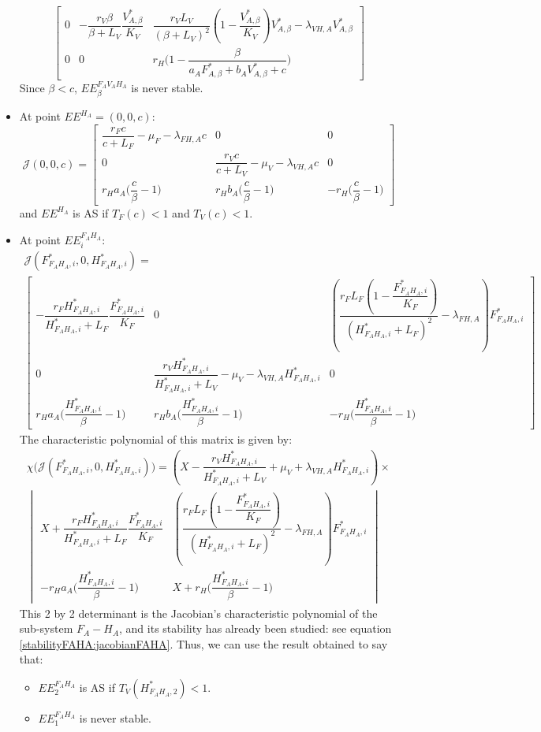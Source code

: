 \documentclass{article}
\newcommand{\lfa}{\lambda_{FH, A}}
\newcommand{\lva}{\lambda_{VH, A}}
\begin{document}
\begin{itemize}
\[\begin{bmatrix}
0 & -\dfrac{r_V \beta}{\beta + L_V}\dfrac{V^*_{A, \beta}}{K_V} & \dfrac{r_V L_V}{(\beta+L_V)^2}\left(1-\dfrac{V^*_{A, \beta}}{K_V}\right)V^*_{A, \beta}  - \lva V^*_{A, \beta} \\
0 & 0 & r_H \Big(1-\dfrac{\beta}{a_AF^*_{A, \beta} + b_AV^*_{A, \beta} + c}\Big)
\end{bmatrix}
\]
Since $\beta < c$, $EE^{F_AV_AH_A}_\beta$ is never stable.
\item At point $EE^{H_A} = (0, 0, c)$:
\[
\mathcal{J}(0,0,c) = \begin{bmatrix}
\dfrac{r_F c}{c + L_F} - \mu_F - \lfa c & 0 & 0\\
0 &\dfrac{r_V c}{c + L_V} - \mu_V - \lva c & 0\\
r_H a_A \Big(\dfrac{c}{\beta}-1\Big) & r_H b_A \Big(\dfrac{c}{\beta}-1\Big) & -r_H \Big(\dfrac{c}{\beta}-1\Big)
\end{bmatrix}
\]
and $EE^{H_A}$ is AS if $T_F(c) < 1$ and $T_V(c) < 1$.
\item At point $EE^{F_AH_A}_i$:
\begin{multline*}
\mathcal{J}(F^*_{F_AH_A, i},0,H^*_{F_AH_A, i}) = \\ \begin{bmatrix}
-\dfrac{r_F H^*_{F_AH_A, i}}{H^*_{F_AH_A, i} + L_F}\dfrac{F^*_{F_AH_A, i}}{K_F} & 0 & \left(\dfrac{r_F L_F \left(1-\dfrac{F^*_{F_AH_A, i}}{K_F}\right)}{(H^*_{F_AH_A, i}+L_F)^2}  - \lfa\right) F^*_{F_AH_A, i} \\
0 &\dfrac{r_V H^*_{F_AH_A, i}}{H^*_{F_AH_A, i} + L_V} - \mu_V - \lva H^*_{F_AH_A, i} & 0\\ 
 r_H a_A \Big(\dfrac{H^*_{F_AH_A, i}}{\beta}-1\Big) & r_H b_A \Big(\dfrac{H^*_{F_AH_A, i}}{\beta}-1\Big) & -r_H \Big(\dfrac{H^*_{F_AH_A, i}}{\beta}-1\Big)
\end{bmatrix}
\end{multline*}
The characteristic polynomial of this matrix is given by:
\begin{multline}
\chi\Big(\mathcal{J}(F^*_{F_AH_A, i},0,H^*_{F_AH_A, i})\Big) = \left(X - \dfrac{r_V H^*_{F_AH_A, i}}{H^*_{F_AH_A, i} + L_V} + \mu_V + \lva H^*_{F_AH_A, i}\right) \times \\
\begin{vmatrix}
X + \dfrac{r_F H^*_{F_AH_A, i}}{H^*_{F_AH_A, i} + L_F}\dfrac{F^*_{F_AH_A, i}}{K_F} & \left(\dfrac{r_F L_F \left(1-\dfrac{F^*_{F_AH_A, i}}{K_F}\right)}{(H^*_{F_AH_A, i}+L_F)^2}  - \lfa\right) F^*_{F_AH_A, i} \\
 -r_H a_A \Big(\dfrac{H^*_{F_AH_A, i}}{\beta}-1\Big) & X + r_H \Big(\dfrac{H^*_{F_AH_A, i}}{\beta}-1\Big)
\end{vmatrix}
\end{multline}
This 2 by 2 determinant is the Jacobian's characteristic polynomial of the sub-system $F_A-H_A$, and its stability has already been studied: see equation \eqref{stabilityFAHA:jacobianFAHA}.
Thus, we can use the result obtained to say that:
\begin{itemize}
\item $EE^{F_AH_A}_2$ is AS if $T_V(H^*_{F_AH_A, 2}) < 1$.
\item $EE^{F_AH_A}_1$ is never stable.
\end{itemize}
 


\end{itemize}
\end{document}
